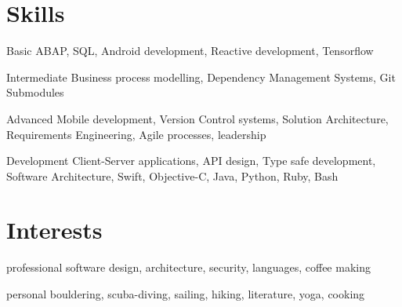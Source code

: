 \documentclass[]{friggeri-cv} %
\begin{document}

\section{Skills}

\begin{entrylist}

	
	\smallentry
	{Basic}
	{ABAP, SQL, Android development, Reactive development, Tensorflow}
	
	
	\smallentry
	{Intermediate}
	{Business process modelling, Dependency Management Systems, Git Submodules}
	
	
	\smallentry
	{Advanced}
	{Mobile development, Version Control systems, Solution Architecture, Requirements Engineering, Agile processes, leadership}
	
	
	\smallentry
	{Development}
	{Client-Server applications, API design, Type safe development, Software Architecture, Swift, Objective-C, Java, Python, Ruby, Bash}


\end{entrylist}


\section{Interests}

\begin{entrylist}
	\smallentry
	{professional}
	{software design, architecture, security, languages, coffee making}

	\smallentry
	{personal}
	{bouldering, scuba-diving, sailing, hiking, literature, yoga, cooking}
	
\end{entrylist}
\end{document}
